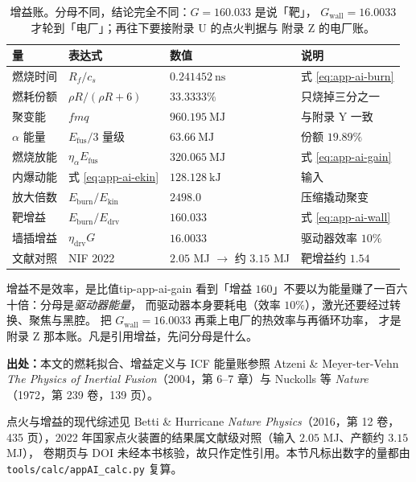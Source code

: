 \begin{table}[htbp]
\centering
\small
\caption{增益账。分母不同，结论完全不同：$G = 160.033$ 是说「靶」，
$G_{\mathrm{wall}} = 16.0033$ 才轮到「电厂」；再往下要接附录 U 的点火判据与
附录 Z 的电厂账。}
\label{tab:app-ai-burn}
\begin{tabular}{p{4.0cm}p{3.0cm}p{3.0cm}p{3.0cm}}
\toprule
量 & 表达式 & 数值 & 说明 \\
\midrule
燃烧时间 & $R_f/c_s$ & $0.241452\ \mathrm{ns}$ & 式 \eqref{eq:app-ai-burn} \\
燃耗份额 & $\rho R/(\rho R+6)$ & $33.3333\%$ & 只烧掉三分之一 \\
聚变能 & $f m q$ & $960.195\ \mathrm{MJ}$ & 与附录 Y 一致 \\
$\alpha$ 能量 & $E_{\mathrm{fus}}/3$ 量级 & $63.66\ \mathrm{MJ}$ & 份额 $19.89\%$ \\
燃烧放能 & $\eta_\alpha E_{\mathrm{fus}}$ & $320.065\ \mathrm{MJ}$ & 式 \eqref{eq:app-ai-gain} \\
内爆动能 & 式 \eqref{eq:app-ai-ekin} & $128.128\ \mathrm{kJ}$ & 输入 \\
放大倍数 & $E_{\mathrm{burn}}/E_{\mathrm{kin}}$ & $2498.0$ & 压缩撬动聚变 \\
靶增益 & $E_{\mathrm{burn}}/E_{\mathrm{drv}}$ & $160.033$ & 式 \eqref{eq:app-ai-wall} \\
墙插增益 & $\eta_{\mathrm{drv}} G$ & $16.0033$ & 驱动器效率 $10\%$ \\
文献对照 & NIF 2022 & $2.05$ MJ $\to$ 约 $3.15$ MJ & 靶增益约 $1.54$ \\
\bottomrule
\end{tabular}

\end{table}

\begin{tip}{增益不是效率，是比值}{tip-app-ai-gain}
看到「增益 $160$」不要以为能量赚了一百六十倍：分母是\emph{驱动器能量}，
而驱动器本身要耗电（效率 $10\%$），激光还要经过转换、聚焦与黑腔。
把 $G_{\mathrm{wall}} = 16.0033$ 再乘上电厂的热效率与再循环功率，
才是附录 Z 那本账。凡是引用增益，先问分母是什么。
\end{tip}

{\footnotesize
\textbf{出处：}本文的燃耗拟合、增益定义与 ICF 能量账参照 Atzeni \&
Meyer-ter-Vehn \emph{The Physics of Inertial Fusion}（2004，第 6--7 章）与
Nuckolls 等 \emph{Nature}（1972，第 239 卷，139 页）。

点火与增益的现代综述见
Betti \& Hurricane \emph{Nature Physics}（2016，第 12 卷，435 页），2022 年国家点火装置的结果属文献级对照（输入 $2.05$ MJ、产额约 $3.15$ MJ），
卷期页与 DOI 未经本书核验，故只作定性引用。本节凡标出数字的量都由
\texttt{tools/\allowbreak{}calc/\allowbreak{}appAI\_calc.py} 复算。
}

